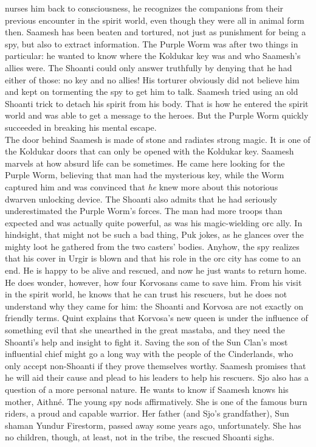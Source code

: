 nurses him back to consciousness, he recognizes the companions from their previous encounter in the spirit world, even though they were all in animal form then. Saamesh has been beaten and tortured, not just as punishment for being a spy, but also to extract information. The Purple Worm was after two things in particular: he wanted to know where the Koldukar key was and who Saamesh's allies were. The Shoanti could only answer truthfully by denying that he had either of those: no key and no allies! His torturer obviously did not believe him and kept on tormenting the spy to get him to talk. Saamesh tried using an old Shoanti trick to detach his spirit from his body. That is how he entered the spirit world and was able to get a message to the heroes. But the Purple Worm quickly succeeded in breaking his mental escape.\\

The door behind Saamesh is made of stone and radiates strong magic. It is one of the Koldukar doors that can only be opened with the Koldukar key. Saamesh marvels at how absurd life can be sometimes. He came here looking for the Purple Worm, believing that man had the mysterious key, while the Worm captured him and was convinced that {\itshape he} knew more about this notorious dwarven unlocking device. The Shoanti also admits that he had seriously underestimated the Purple Worm's forces. The man had more troops than expected and was actually quite powerful, as was his magic-wielding orc ally. In hindsight, that might not be such a bad thing, Puk jokes, as he glances over the mighty loot he gathered from the two casters' bodies. Anyhow, the spy realizes that his cover in Urgir is blown and that his role in the orc city has come to an end. He is happy to be alive and rescued, and now he just wants to return home. He does wonder, however, how four Korvosans came to save him. From his visit in the spirit world, he knows that he can trust his rescuers, but he does not understand why they came for him: the Shoanti and Korvosa are not exactly on friendly terms. Quint explains that Korvosa's new queen is under the influence of something evil that she unearthed in the great mastaba, and they need the Shoanti's help and insight to fight it. Saving the son of the Sun Clan's most influential chief might go a long way with the people of the Cinderlands, who only accept non-Shoanti if they prove themselves worthy. Saamesh promises that he will aid their cause and plead to his leaders to help his rescuers. Sjo also has a question of a more personal nature. He wants to know if Saamesh knows his mother, Aithn\'e. The young spy nods affirmatively. She is one of the famous burn riders, a proud and capable warrior. Her father (and Sjo's grandfather), Sun shaman Yundur Firestorm, passed away some years ago, unfortunately. She has no children, though, at least, not in the tribe, the rescued Shoanti sighs.\\

